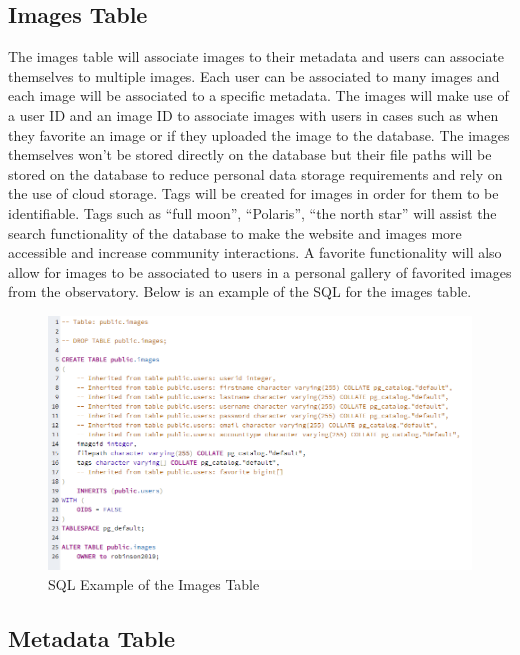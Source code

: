 \documentclass[12pt]{report}
\begin{document}
\begin{enumerate}
\subsection*{Images Table}

The images table will associate images to their metadata and users can associate themselves to multiple images.  Each user can be associated to many images and each image will be associated to a specific metadata.  The images will make use of a user ID and an image ID to associate images with users in cases such as when they favorite an image or if they uploaded the image to the database.  The images themselves won’t be stored directly on the database but their file paths will be stored on the database to reduce personal data storage requirements and rely on the use of cloud storage.  Tags will be created for images in order for them to be identifiable. Tags such as “full moon”, “Polaris”, “the north star” will assist the search functionality of the database to make the website and images more accessible and increase community interactions.  A favorite functionality will also allow for images to be associated to users in a personal gallery of favorited images from the observatory.  Below is an example of the SQL for the images table.

\begin{figure}[h]
	\centering
	\includegraphics[width=\linewidth]{database_images_table}
	\caption{SQL Example of the Images Table}
	\label{fig:SQL Images Table}
\end{figure}

\subsection{Metadata Table}


\end{enumerate}
\end{document}
